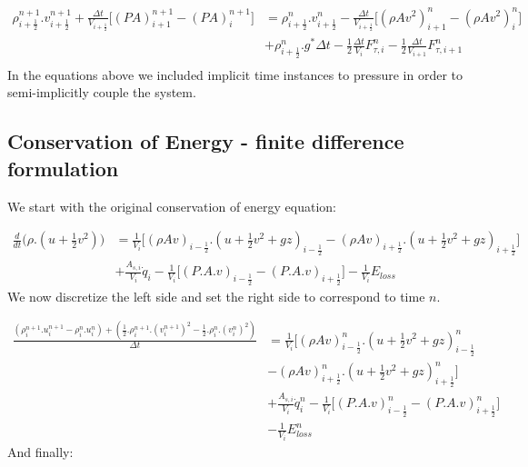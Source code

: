 \documentclass[11pt,letterpaper,titlepage]{article}
\newcommand{\half}{\frac{1}{2}}
\begin{document}
\begin{equation}
\begin{aligned}
\rho_{i+\half}^{n+1}.v_{i+\half}^{n+1} +\frac{\Delta t}{V_{i+\half}} \biggr[   (PA)_{i+1}^{n+1}-(PA)_{i}^{n+1}  \biggr]     &=\rho_{i+\half}^n.v_{i+\half}^n - \frac{\Delta t}{V_{i+\half}} \biggr[   (\rho Av^2)_{i+1}^n - (\rho Av^2)_{i}^n \biggr]\\
& +\rho_{i+\half}^n.g^*\Delta t -\half \frac{\Delta t}{V_i}F_{\tau,i}^n-\half \frac{\Delta t}{V_{i+1}}F_{\tau,i+1}^n\\
\end{aligned}
\end{equation}
\newline
\noindent In the equations above we included implicit time instances to pressure in order to semi-implicitly couple the system.




\subsection{Conservation of Energy - finite difference formulation}
We start with the original conservation of energy equation:

\begin{equation*}
\begin{aligned}
\frac{d}{dt} \biggr( \rho.(u+\half v^2) \biggr)&=\frac{1}{V_i}\biggr[ (\rho Av)_{i-\half}.(u+\half v^2+gz)_{i-\half} - (\rho Av)_{i+\half}.(u+\half v^2+gz)_{i+\half} \biggr] \\
&+\frac{A_{s,i}}{V_i}\dot{q}_i - \frac{1}{V_i}\biggr[   (P.A.v)_{i-\half} - (P.A.v)_{i+\half}   \biggr] - \frac{1}{V_i}E_{loss}
\end{aligned}
\end{equation*}
\newline
\noindent We now discretize the left side and set the right side to correspond to time $n$.

\begin{equation*}
\begin{aligned}
\frac{(\rho_i^{n+1}.u_i^{n+1}-  \rho_i^{n}.u_i^{n}) + (\half.\rho_i^{n+1}.(v_i^{n+1})^2   -\half.\rho_i^{n}.(v_i^{n})^2)}{\Delta t}&=\frac{1}{V_i}\biggr[ (\rho Av)_{i-\half}^n.(u+\half v^2+gz)_{i-\half}^n \\
&- (\rho Av)_{i+\half}^n.(u+\half v^2+gz)_{i+\half}^n \biggr] \\
&+\frac{A_{s,i}}{V_i}\dot{q}_i^n - \frac{1}{V_i}\biggr[   (P.A.v)_{i-\half}^n - (P.A.v)_{i+\half}^n   \biggr] \\
&- \frac{1}{V_i}E_{loss}^n
\end{aligned}
\end{equation*}
\newline
\noindent And finally:
\end{document}
